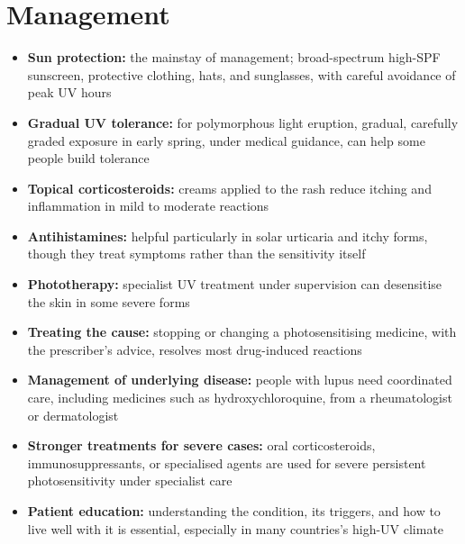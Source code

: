 \section*{Management}
\begin{itemize}
    \item \textbf{Sun protection:} the mainstay of management; broad-spectrum high-SPF sunscreen, protective clothing, hats, and sunglasses, with careful avoidance of peak UV hours
    \item \textbf{Gradual UV tolerance:} for polymorphous light eruption, gradual, carefully graded exposure in early spring, under medical guidance, can help some people build tolerance
    \item \textbf{Topical corticosteroids:} creams applied to the rash reduce itching and inflammation in mild to moderate reactions
    \item \textbf{Antihistamines:} helpful particularly in solar urticaria and itchy forms, though they treat symptoms rather than the sensitivity itself
    \item \textbf{Phototherapy:} specialist UV treatment under supervision can desensitise the skin in some severe forms
    \item \textbf{Treating the cause:} stopping or changing a photosensitising medicine, with the prescriber's advice, resolves most drug-induced reactions
    \item \textbf{Management of underlying disease:} people with lupus need coordinated care, including medicines such as hydroxychloroquine, from a rheumatologist or dermatologist
    \item \textbf{Stronger treatments for severe cases:} oral corticosteroids, immunosuppressants, or specialised agents are used for severe persistent photosensitivity under specialist care
    \item \textbf{Patient education:} understanding the condition, its triggers, and how to live well with it is essential, especially in many countries's high-UV climate
\end{itemize}


